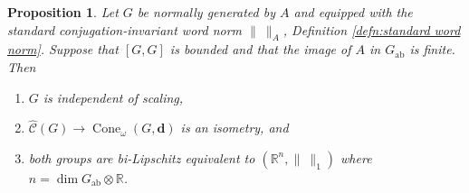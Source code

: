 \documentclass[12pt]{amsart}
\newtheorem{prop}{Proposition}[section]
\theoremstyle{definition}
\def\RR{\ensuremath{\mathbb{R}}}
\newcommand{\B}[1]{\mathbf{#1}}
\newcommand{\OP}[1]{\operatorname{#1}}
\def\Cone{\OP{Cone}}
\def\tC{\hat{\mathcal{C}}}
\begin{document}
\begin{prop}\label{prop:quotient by bounded comm standard word norm}
Let $G$ be normally generated by $A$ and equipped with the standard conjugation-invariant word norm $\| \ \|_A$, Definition \ref{defn:standard word norm}.
Suppose that $[G,G]$ is bounded and that the image of $A$ in $G_{\OP{ab}}$ is finite.
Then 
\begin{enumerate}[label=(\alph*)]
\item\label{item:prop quotient bdd comm:scaling}
$G$ is independent of scaling, 
\item\label{item:prop quotient bdd comm:rho}
$\tC(G) \to \Cone_\omega(G,\B d)$ is an isometry, and 
\item\label{item:prop quotient bdd comm:Rn}
both groups are bi-Lipschitz equivalent to $(\RR^n,\| \ \|_1)$ where $n=\dim G_{\OP{ab}} \otimes \RR$. %
\end{enumerate}
\end{prop}
\end{document}
